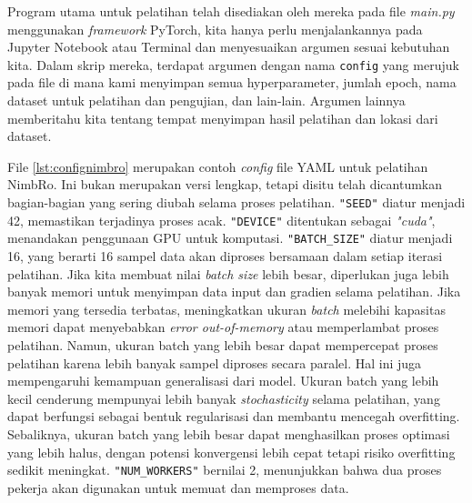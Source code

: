 Program utama untuk pelatihan telah disediakan oleh mereka pada file \emph{main.py} menggunakan \textit{framework} PyTorch, kita hanya perlu menjalankannya pada Jupyter Notebook atau Terminal dan menyesuaikan argumen sesuai kebutuhan kita.
Dalam skrip mereka, terdapat argumen dengan nama \verb|config| yang merujuk pada file di mana kami menyimpan semua hyperparameter, jumlah epoch, nama dataset untuk pelatihan dan pengujian, dan lain-lain.
Argumen lainnya memberitahu kita tentang tempat menyimpan hasil pelatihan dan lokasi dari dataset.
\newpage

File \ref{lst:confignimbro} merupakan contoh \textit{config} file YAML untuk pelatihan NimbRo. Ini bukan merupakan versi lengkap, tetapi disitu telah dicantumkan bagian-bagian yang sering diubah selama proses pelatihan.
\verb|"SEED"| diatur menjadi 42, memastikan terjadinya proses acak. \verb|"DEVICE"| ditentukan sebagai \textit{"cuda"}, menandakan penggunaan GPU untuk komputasi.
\verb|"BATCH_SIZE"| diatur menjadi 16, yang berarti 16 sampel data akan diproses bersamaan dalam setiap iterasi pelatihan. Jika kita membuat nilai \emph{batch size} lebih besar, diperlukan juga lebih banyak memori untuk menyimpan data input dan gradien selama pelatihan.
Jika memori yang tersedia terbatas, meningkatkan ukuran \textit{batch} melebihi kapasitas memori dapat menyebabkan \textit{error out-of-memory} atau memperlambat proses pelatihan.
Namun, ukuran batch yang lebih besar dapat mempercepat proses pelatihan karena lebih banyak sampel diproses secara paralel. Hal ini juga mempengaruhi kemampuan generalisasi dari model.
Ukuran batch yang lebih kecil cenderung mempunyai lebih banyak \textit{stochasticity} selama pelatihan, yang dapat berfungsi sebagai bentuk regularisasi dan membantu mencegah overfitting. Sebaliknya, ukuran batch yang lebih besar dapat menghasilkan proses optimasi yang lebih halus, dengan potensi konvergensi lebih cepat tetapi risiko overfitting sedikit meningkat.
\verb|"NUM_WORKERS"| bernilai 2, menunjukkan bahwa dua proses pekerja akan digunakan untuk memuat dan memproses data.

